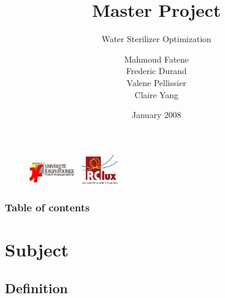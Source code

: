 \documentclass[xcolor=dvipsnames,10pt]{beamer}
\author{Mahmoud Fatene \\ Frederic Durand \\ Valene Pellissier \\ Claire Yang}
\title[Master Project]{Master Project}
\subtitle{Water Sterilizer Optimization}
\date{January 2008}
\begin{document}
\begin{frame}
	\titlepage
	\begin{figure}
	\raggedleft
	\includegraphics[height=1cm, width=2cm]{./images/logoUJF.jpg}
	\hspace{65mm}
	\raggedright
	\includegraphics[height=1.3cm, width=2cm]{./images/logoRCLux.jpg}
	\end{figure}
\end{frame}

\begin{frame}
	\frametitle{Table of contents}
	\tableofcontents
\end{frame}


\section{Subject}

\subsection{Definition}
\end{document}
